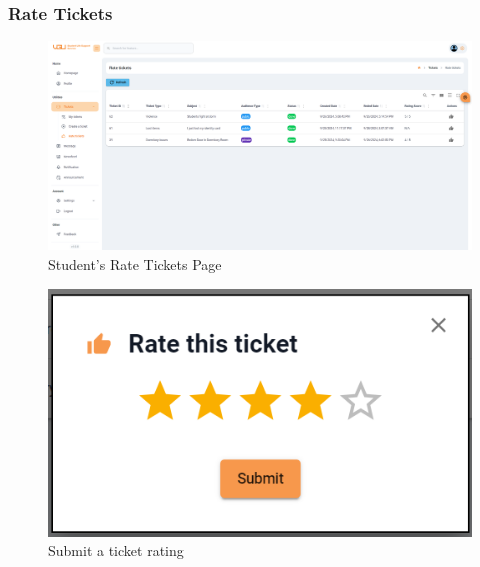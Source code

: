 	\subsubsection{Rate Tickets}
	\begin{figure}[H]
		\centering
		\includegraphics[width=1.0\linewidth]{graphics/gui/student/rate-ticket}
		\caption{Student's Rate Tickets Page}
		\label{fig:gui-std-rate-ticket}
	\end{figure}
	
	
	
	\begin{figure}[H]
		\centering
		\includegraphics[width=0.5\linewidth]{graphics/gui/student/rate-ticket1}
		\caption{Submit a ticket rating}
		\label{fig:gui-rate-ticket-modal}
	\end{figure}
	
	
	
